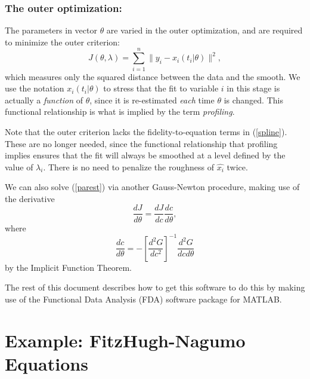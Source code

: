 \documentclass{article}
\begin{document}
\subsubsection{The outer optimization:}

The parameters in vector $\theta$ are varied in the outer optimization, and are required to
minimize the outer criterion:
\begin{equation} \label{parest}
  J(\theta,\lambda) = \sum_{i=1}^n \|y_i - x_i(t_i|\theta)\|^2,
\end{equation}
which measures only the squared distance between the data and the smooth.  We use the notation
$x_i(t_i|\theta)$ to stress that the fit to variable $i$ in this stage is actually a
\emph{function} of $\theta$, since it is re-estimated \emph{each} time $\theta$ is changed.  This
functional relationship is what is implied by the term \emph{profiling}.

Note that the outer criterion lacks the fidelity-to-equation terms in (\ref{spline}).  These are no
longer needed, since the functional relationship that profiling implies ensures that the fit will
always be smoothed at a level defined by the value of $\lambda_i$.  There is no need to penalize
the roughness of $\hat{x_i}$ twice.

We can also solve (\ref{parest}) via another Gauss-Newton procedure, making use of the derivative
\[
  \frac{dJ}{d\theta} = \frac{dJ}{dc} \frac{dc}{d\theta},
\]
where
\[
  \frac{dc}{d\theta} = - \left[ \frac{d^2G}{dc^2} \right]^{-1} \frac{d^2G}{dcd\theta}
\]
by the Implicit Function Theorem.

The rest of this document describes how to get this software to do this by making use of the
Functional Data Analysis (FDA) software package for MATLAB.

\section{Example: FitzHugh-Nagumo Equations}
\end{document}
